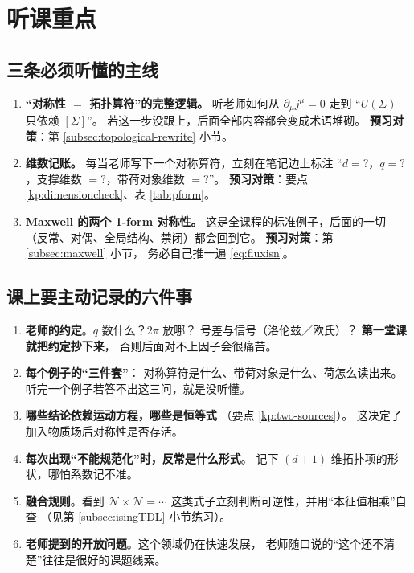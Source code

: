 \documentclass[UTF8,a4paper,11pt]{ctexart}
\theoremstyle{plain}
\theoremstyle{definition}
\theoremstyle{remark}
\newcommand{\Ssurf}{\Sigma}
\newcommand{\Uop}{U}
\begin{document}
\section{听课重点}
\label{sec:focus}

\subsection{三条必须听懂的主线}

\begin{enumerate}[label=\textbf{\Roman*.},leftmargin=1.1cm]
  \item \textbf{“对称性 $=$ 拓扑算符”的完整逻辑。}
        听老师如何从 $\partial_\mu j^\mu=0$ 走到
        “$\Uop(\Ssurf)$ 只依赖 $[\Ssurf]$”。
        若这一步没跟上，后面全部内容都会变成术语堆砌。
        \textbf{预习对策}：第 \ref{subsec:topological-rewrite} 小节。
  \item \textbf{维数记账。}
        每当老师写下一个对称算符，立刻在笔记边上标注
        “$d=?$，$q=?$，支撑维数 $=?$，带荷对象维数 $=?$”。
        \textbf{预习对策}：要点 \ref{kp:dimensioncheck}、表 \ref{tab:pform}。
  \item \textbf{Maxwell 的两个 1-form 对称性。}
        这是全课程的标准例子，后面的一切
        （反常、对偶、全局结构、禁闭）都会回到它。
        \textbf{预习对策}：第 \ref{subsec:maxwell} 小节，
        务必自己推一遍 \eqref{eq:fluxisn}。
\end{enumerate}

\subsection{课上要主动记录的六件事}

\begin{enumerate}[label=\textbf{\arabic*.},leftmargin=1.1cm]
  \item \textbf{老师的约定}。$q$ 数什么？$2\pi$ 放哪？
        号差与信号（洛伦兹／欧氏）？
        \textbf{第一堂课就把约定抄下来}，
        否则后面对不上因子会很痛苦。
  \item \textbf{每个例子的“三件套”}：
        对称算符是什么、带荷对象是什么、荷怎么读出来。
        听完一个例子若答不出这三问，就是没听懂。
  \item \textbf{哪些结论依赖运动方程，哪些是恒等式}
        （要点 \ref{kp:two-sources}）。
        这决定了加入物质场后对称性是否存活。
  \item \textbf{每次出现“不能规范化”时，反常是什么形式}。
        记下 $(d+1)$ 维拓扑项的形状，哪怕系数记不准。
  \item \textbf{融合规则}。看到 $\mathcal N\times\mathcal N=\cdots$
        这类式子立刻判断可逆性，并用“本征值相乘”自查
        （见第 \ref{subsec:isingTDL} 小节练习）。
  \item \textbf{老师提到的开放问题}。这个领域仍在快速发展，
        老师随口说的“这个还不清楚”往往是很好的课题线索。
\end{enumerate}
\end{document}
